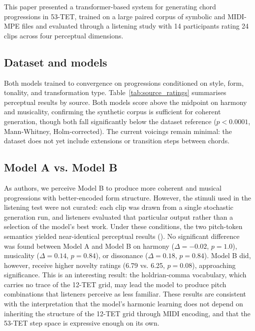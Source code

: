 \documentclass{aimc2026}
\begin{document}
This paper presented a transformer-based system for generating chord progressions in 53-TET, trained on a large paired corpus of symbolic and MIDI-MPE files and evaluated through a listening study with 14 participants rating 24 clips across four perceptual dimensions.

\subsection{Dataset and models}

Both models trained to convergence on progressions conditioned on style, form, tonality, and transformation type. Table~\ref{tab:source_ratings} summarises perceptual results by source. Both models score above the midpoint on harmony and musicality, confirming the synthetic corpus is sufficient for coherent generation, though both fall significantly below the dataset reference ($p < 0.0001$, Mann-Whitney, Holm-corrected). The current voicings remain minimal: the dataset does not yet include extensions or transition steps between chords.


\subsection{Model A vs. Model B}

As authors, we perceive Model B to produce more coherent and musical progressions with better-encoded form structure. However, the stimuli used in the listening test were not curated: each clip was drawn from a single stochastic generation run, and listeners evaluated that particular output rather than a selection of the model's best work. Under these conditions, the two pitch-token semantics yielded near-identical perceptual results (). No significant difference was found between Model A and Model B on harmony ($\Delta = -0.02$, $p = 1.0$), musicality ($\Delta = 0.14$, $p = 0.84$), or dissonance ($\Delta = 0.18$, $p = 0.84$). Model B did, however, receive higher novelty ratings (6.79 vs. 6.25, $p = 0.08$), approaching significance. This is an interesting result: the holdrian-comma vocabulary, which carries no trace of the 12-TET grid, may lead the model to produce pitch combinations that listeners perceive as less familiar. These results are consistent with the interpretation that the model's harmonic learning does not depend on inheriting the structure of the 12-TET grid through MIDI encoding, and that the 53-TET step space is expressive enough on its own.
\end{document}
